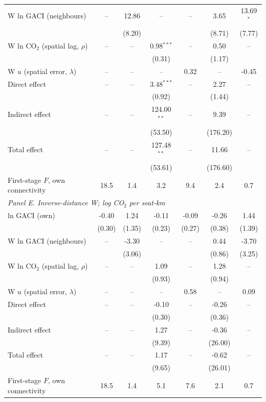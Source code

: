 \begin{table}[htbp]
\begin{threeparttable}
\begin{tabular}{lcccccc}
  W ln GACI (neighbours) & -- & 12.86 & -- & -- & 3.65 & 13.69$^{*}$ \\
   &  & (8.20) &  &  & (8.71) & (7.77) \\
  W ln CO$_2$ (spatial lag, $\rho$) & -- & -- & 0.98$^{***}$ & -- & 0.50 & -- \\
   &  &  & (0.31) &  & (1.17) &  \\
  W $u$ (spatial error, $\lambda$) & -- & -- & -- & 0.32 & -- & -0.45 \\
  Direct effect & -- & -- & 3.48$^{***}$ & -- & 2.27 & -- \\
   &  &  & (0.92) &  & (1.44) &  \\
  Indirect effect & -- & -- & 124.00$^{**}$ & -- & 9.39 & -- \\
   &  &  & (53.50) &  & (176.20) &  \\
  Total effect & -- & -- & 127.48$^{**}$ & -- & 11.66 & -- \\
   &  &  & (53.61) &  & (176.60) &  \\
  First-stage $F$, own connectivity & 18.5 & 1.4 & 3.2 & 9.4 & 2.4 & 0.7 \\
\midrule
\multicolumn{7}{l}{\textit{Panel E. Inverse-distance W; log CO$_2$ per seat-km}} \\
  ln GACI (own) & -0.40 & 1.24 & -0.11 & -0.09 & -0.26 & 1.44 \\
   & (0.30) & (1.35) & (0.23) & (0.27) & (0.38) & (1.39) \\
  W ln GACI (neighbours) & -- & -3.30 & -- & -- & 0.44 & -3.70 \\
   &  & (3.06) &  &  & (0.86) & (3.25) \\
  W ln CO$_2$ (spatial lag, $\rho$) & -- & -- & 1.09 & -- & 1.28 & -- \\
   &  &  & (0.93) &  & (0.94) &  \\
  W $u$ (spatial error, $\lambda$) & -- & -- & -- & 0.58 & -- & 0.09 \\
  Direct effect & -- & -- & -0.10 & -- & -0.26 & -- \\
   &  &  & (0.30) &  & (0.36) &  \\
  Indirect effect & -- & -- & 1.27 & -- & -0.36 & -- \\
   &  &  & (9.39) &  & (26.00) &  \\
  Total effect & -- & -- & 1.17 & -- & -0.62 & -- \\
   &  &  & (9.65) &  & (26.01) &  \\
  First-stage $F$, own connectivity & 18.5 & 1.4 & 5.1 & 7.6 & 2.1 & 0.7 \\

\end{tabular}
\end{threeparttable}
\end{table}
